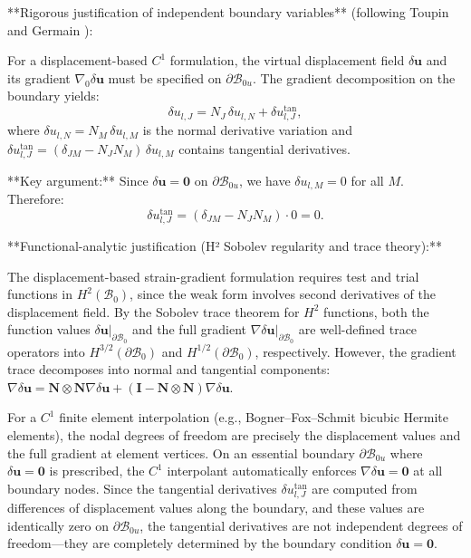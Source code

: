 \documentclass[11pt]{article}
\begin{document}
**Rigorous justification of independent boundary variables** (following Toupin \cite{Toupin1964} and Germain \cite{Germain1973}):

For a displacement-based $C^1$ formulation, the virtual displacement field $\delta\mathbf{u}$ and its gradient $\nabla_0\delta\mathbf{u}$ must be specified on $\partial\mathcal{B}_{0u}$. The gradient decomposition on the boundary yields:
\begin{equation}
\delta u_{l,J} = N_J\,\delta u_{l,N} + \delta u_{l,J}^{\mathrm{tan}},
\end{equation}
where $\delta u_{l,N} = N_M\,\delta u_{l,M}$ is the normal derivative variation and $\delta u_{l,J}^{\mathrm{tan}} = (\delta_{JM}-N_JN_M)\,\delta u_{l,M}$ contains tangential derivatives.

**Key argument:** Since $\delta\mathbf{u} = \mathbf{0}$ on $\partial\mathcal{B}_{0u}$, we have $\delta u_{l,M} = 0$ for all $M$. Therefore:
\begin{equation}
\delta u_{l,J}^{\mathrm{tan}} = (\delta_{JM}-N_JN_M)\cdot 0 = 0.
\end{equation}

**Functional-analytic justification (H² Sobolev regularity and trace theory):**

The displacement-based strain-gradient formulation requires test and trial functions in $H^2(\mathcal{B}_0)$, since the weak form involves second derivatives of the displacement field. By the Sobolev trace theorem for $H^2$ functions, both the function values $\delta\mathbf{u}|_{\partial\mathcal{B}_{0}}$ and the full gradient $\nabla\delta\mathbf{u}|_{\partial\mathcal{B}_{0}}$ are well-defined trace operators into $H^{3/2}(\partial\mathcal{B}_{0})$ and $H^{1/2}(\partial\mathcal{B}_{0})$, respectively. However, the gradient trace decomposes into normal and tangential components: $\nabla\delta\mathbf{u} = \mathbf{N}\otimes\mathbf{N}\nabla\delta\mathbf{u} + (\mathbf{I}-\mathbf{N}\otimes\mathbf{N})\nabla\delta\mathbf{u}$.

For a $C^1$ finite element interpolation (e.g., Bogner--Fox--Schmit bicubic Hermite elements), the nodal degrees of freedom are precisely the displacement values and the full gradient at element vertices. On an essential boundary $\partial\mathcal{B}_{0u}$ where $\delta\mathbf{u} = \mathbf{0}$ is prescribed, the $C^1$ interpolant automatically enforces $\nabla\delta\mathbf{u} = \mathbf{0}$ at all boundary nodes. Since the tangential derivatives $\delta u_{l,J}^{\mathrm{tan}}$ are computed from differences of displacement values along the boundary, and these values are identically zero on $\partial\mathcal{B}_{0u}$, the tangential derivatives are not independent degrees of freedom—they are completely determined by the boundary condition $\delta\mathbf{u} = \mathbf{0}$.
\end{document}
